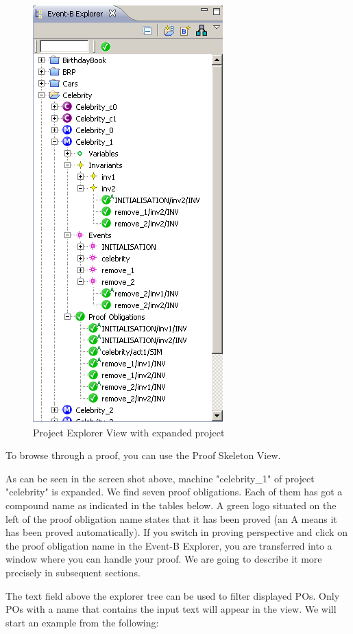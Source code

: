 \begin{figure}[!h]
\begin{center}
	\includegraphics{img/reference/ref_01_project_explorer3.png}
	\caption{Project Explorer View with expanded project}
	\label{fig_ref_01_project_explorer3}
\end{center}
\end{figure}

To browse through a proof, you can use the Proof Skeleton View.

As can be seen in the screen shot above, machine "celebrity\_1" of project "celebrity" is expanded. We find seven proof obligations. Each of them has got a compound name as indicated in the tables below. A green logo situated on the left of the proof obligation name states that it has been proved (an A means it has been proved automatically). If you switch in proving perspective and click on the proof obligation name in the Event-B Explorer, you are transferred into a window where you can handle your proof. We are going to describe it more precisely in subsequent sections.

The text field above the explorer tree can be used to filter displayed POs. Only POs with a name that contains the input text will appear in the view. We will start an example from the following: 

